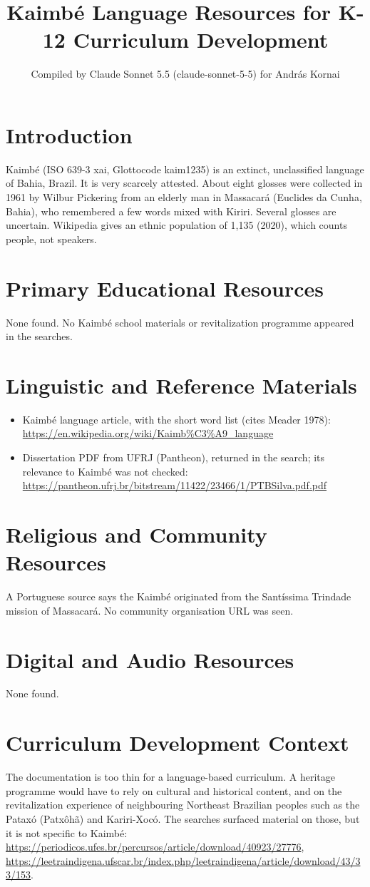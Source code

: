 \documentclass[12pt]{article}
\title{Kaimb\'e Language Resources for K-12 Curriculum Development}
\author{Compiled by Claude Sonnet 5.5 (claude-sonnet-5-5) for Andr\'as Kornai}
\date{}
\begin{document}
\maketitle

\section{Introduction}
Kaimb\'e (ISO 639-3 xai, Glottocode kaim1235) is an extinct, unclassified language of Bahia, Brazil. It is very scarcely attested. About eight glosses were collected in 1961 by Wilbur Pickering from an elderly man in Massacar\'a (Euclides da Cunha, Bahia), who remembered a few words mixed with Kiriri. Several glosses are uncertain. Wikipedia gives an ethnic population of 1,135 (2020), which counts people, not speakers.

\section{Primary Educational Resources}
None found. No Kaimb\'e school materials or revitalization programme appeared in the searches.

\section{Linguistic and Reference Materials}
\begin{itemize}
\item Kaimb\'e language article, with the short word list (cites Meader 1978): \url{https://en.wikipedia.org/wiki/Kaimb%C3%A9_language}
\item Dissertation PDF from UFRJ (Pantheon), returned in the search; its relevance to Kaimb\'e was not checked: \url{https://pantheon.ufrj.br/bitstream/11422/23466/1/PTBSilva.pdf.pdf}
\end{itemize}

\section{Religious and Community Resources}
A Portuguese source says the Kaimb\'e originated from the Santíssima Trindade mission of Massacar\'a. No community organisation URL was seen.

\section{Digital and Audio Resources}
None found.

\section{Curriculum Development Context}
The documentation is too thin for a language-based curriculum. A heritage programme would have to rely on cultural and historical content, and on the revitalization experience of neighbouring Northeast Brazilian peoples such as the Pataxó (Patx\^oh\~a) and Kariri-Xoc\'o. The searches surfaced material on those, but it is not specific to Kaimb\'e: \url{https://periodicos.ufes.br/percursos/article/download/40923/27776}, \url{https://leetraindigena.ufscar.br/index.php/leetraindigena/article/download/43/33/153}.
\end{document}
